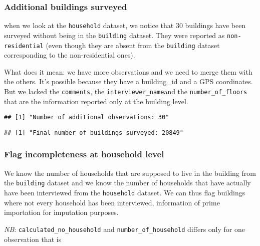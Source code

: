 \documentclass[]{article}
\begin{document}
\subsubsection{Additional buildings
surveyed}\label{additional-buildings-surveyed}

when we look at the \texttt{household} dataset, we notice that 30
buildings have been surveyed without being in the \texttt{building}
dataset. They were reported as \texttt{non-residential} (even though
they are absent from the \texttt{building} dataset corresponding to the
non-residential ones).

What does it mean: we have more observations and we need to merge them
with the others. It's possible because they have a building\_id and a
GPS coordinates. But we lacked the \texttt{comments}, the
\texttt{interviewer\_name}and the \texttt{number\_of\_floors} that are
the information reported only at the building level.

\begin{verbatim}
## [1] "Number of additional observations: 30"
\end{verbatim}

\begin{verbatim}
## [1] "Final number of buildings surveyed: 20849"
\end{verbatim}

\subsubsection{Flag incompleteness at household
level}\label{flag-incompleteness-at-household-level}

We know the number of households that are supposed to live in the
building from the \texttt{building} dataset and we know the number of
households that have actually have been interviewed from the
\texttt{household} dataset. We can thus flag buildings where not every
household has been interviewed, information of prime importation for
imputation purposes.

\emph{NB}: \texttt{calculated\_no\_household} and
\texttt{number\_of\_household} differs only for one observation that is
\end{document}
